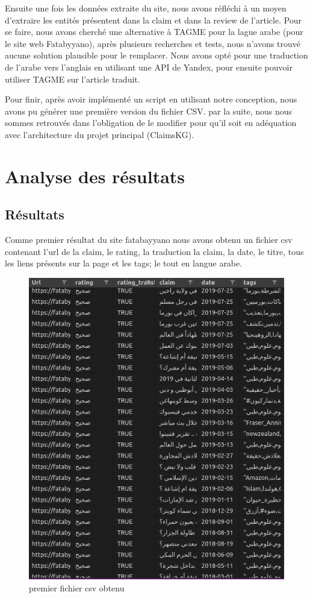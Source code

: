 \documentclass[oneside,13pt,a4paper]{report}
\begin{document}
Ensuite une fois les données extraite du site, nous avons réfléchi à un moyen d'extraire les entités présentent dans la claim et dans la review de l'article. Pour se faire, nous avons cherché une alternative à TAGME pour la lague arabe (pour le site web Fatabyyano), après plusieurs recherches et tests, nous n'avons trouvé aucune solution plausible pour le remplacer. Nous avons opté pour une traduction de l'arabe vers l'anglais en utilisant une API de Yandex, pour ensuite pouvoir utiliser TAGME sur l'article traduit.

Pour finir, après avoir implémenté un script en utilisant notre conception, nous avons pu générer une première version du fichier CSV. par la suite, nous nous sommes retrouvés dans l'obligation de le modifier pour qu'il soit en adéquation avec l'architecture du projet principal (ClaimsKG).

\chapter{Analyse des résultats}

\section{Résultats}
Comme premier résultat du site fatabayyano nous avons obtenu un fichier csv contenant l'url de la claim, le rating, la traduction la claim, la date, le titre, tous les liens présents sur la page et les tags; le tout en langue arabe.
\begin{figure}[h]
	\centering
	\begin{minipage}[c]{.5\linewidth}
		\includegraphics[width=1\textwidth]{img/fatab1.png}
		\caption{premier fichier csv obtenu}
	\end{minipage}
\end{figure}
\end{document}
